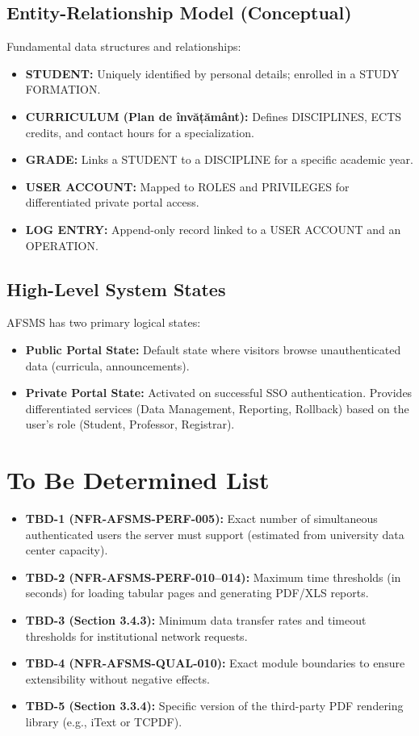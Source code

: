 \documentclass[11pt, a4paper]{article}
\begin{document}
\subsection{Entity-Relationship Model (Conceptual)}
Fundamental data structures and relationships:
\begin{itemize}
    \item \textbf{STUDENT:} Uniquely identified by personal details; enrolled in a STUDY FORMATION.
    \item \textbf{CURRICULUM (Plan de învățământ):} Defines DISCIPLINES, ECTS credits, and contact hours for a specialization.
    \item \textbf{GRADE:} Links a STUDENT to a DISCIPLINE for a specific academic year.
    \item \textbf{USER ACCOUNT:} Mapped to ROLES and PRIVILEGES for differentiated private portal access.
    \item \textbf{LOG ENTRY:} Append-only record linked to a USER ACCOUNT and an OPERATION.
\end{itemize}

\subsection{High-Level System States}
AFSMS has two primary logical states:
\begin{itemize}
    \item \textbf{Public Portal State:} Default state where visitors browse unauthenticated data (curricula, announcements).
    \item \textbf{Private Portal State:} Activated on successful SSO authentication. Provides differentiated services (Data Management, Reporting, Rollback) based on the user's role (Student, Professor, Registrar).
\end{itemize}

\section{To Be Determined List}
\begin{itemize}
    \item \textbf{TBD-1 (NFR-AFSMS-PERF-005):} Exact number of simultaneous authenticated users the server must support (estimated from university data center capacity).
    \item \textbf{TBD-2 (NFR-AFSMS-PERF-010--014):} Maximum time thresholds (in seconds) for loading tabular pages and generating PDF/XLS reports.
    \item \textbf{TBD-3 (Section 3.4.3):} Minimum data transfer rates and timeout thresholds for institutional network requests.
    \item \textbf{TBD-4 (NFR-AFSMS-QUAL-010):} Exact module boundaries to ensure extensibility without negative effects.
    \item \textbf{TBD-5 (Section 3.3.4):} Specific version of the third-party PDF rendering library (e.g., iText or TCPDF).
\end{itemize}
\end{document}
